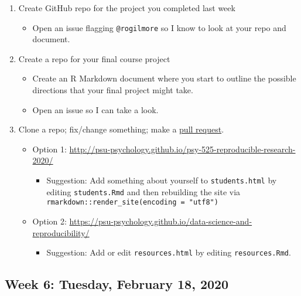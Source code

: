 \documentclass[
]{article}
\providecommand{\tightlist}{%
  \setlength{\itemsep}{0pt}\setlength{\parskip}{0pt}}
\begin{document}
\begin{enumerate}
\def\labelenumi{\arabic{enumi}.}
\tightlist
\item
  Create GitHub repo for the project you completed last week

  \begin{itemize}
  \tightlist
  \item
    Open an issue flagging \texttt{@rogilmore} so I know to look at your
    repo and document.
  \end{itemize}
\item
  Create a repo for your final course project

  \begin{itemize}
  \tightlist
  \item
    Create an R Markdown document where you start to outline the
    possible directions that your final project might take.
  \item
    Open an issue so I can take a look.
  \end{itemize}
\item
  Clone a repo; fix/change something; make a
  \href{https://help.github.com/articles/about-pull-requests/}{pull
  request}.

  \begin{itemize}
  \tightlist
  \item
    Option 1:
    \url{http://psu-psychology.github.io/psy-525-reproducible-research-2020/}

    \begin{itemize}
    \tightlist
    \item
      Suggestion: Add something about yourself to \texttt{students.html}
      by editing \texttt{students.Rmd} and then rebuilding the site via
      \texttt{rmarkdown::render\_site(encoding\ =\ "utf8")}
    \end{itemize}
  \item
    Option 2:
    \url{https://psu-psychology.github.io/data-science-and-reproducibility/}

    \begin{itemize}
    \tightlist
    \item
      Suggestion: Add or edit \texttt{resources.html} by editing
      \texttt{resources.Rmd}.
    \end{itemize}
  \end{itemize}
\end{enumerate}

\hypertarget{week-6-tuesday-february-18-2020}{%
\subsection{Week 6: Tuesday, February 18,
2020}\label{week-6-tuesday-february-18-2020}}
\end{document}
